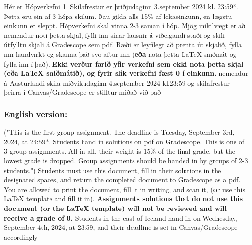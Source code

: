 \noindent
Hér er Hópverkefni 1. Skilafrestur er þriðjudaginn 3.september 2024 kl. 23:59*. Þetta eru ein af 3 hópa skilum. Þau gilda alls 15\% af lokaeinkunn, en lægstu einkunn er sleppt. Hópverkefni skal vinna 2-3 saman í hóp.
\newline
Mjög mikilvægt er að nemendur noti þetta skjal, fylli inn sínar lausnir á viðeigandi staði og skili útfylltu skjali á Gradescope sem pdf. Bæði er leyfilegt að prenta út skjalið, fylla inn handvirkt og skanna það svo aftur inn (\textbf{eða} nota þetta \LaTeX{} sniðmát og fylla inn í það). \textbf{Ekki verður farið yfir verkefni sem ekki nota þetta skjal (eða \LaTeX{} sniðmátið), og fyrir slík verkefni fæst 0 í einkunn.}
\newline
\footnotesize *nemendur á Austurlandi skila miðvikudaginn 4.september 2024 kl.23:59 og skilafrestur þeirra í Canvas/Gradescope er stilltur miðað við það
\normalsize
\subsubsection*{English version:}
("This is the first group assignment. The deadline is Tuesday, September 3rd, 2024, at 23:59*. Students hand in solutions on pdf on Gradescope. This is one of 3 group assignments. All in all, their weight is 15\% of the final grade, but the lowest grade is dropped. Group assignments should be handed in by groups of 2-3 students.")
\newline
Students must use this document, fill in their solutions in the designated spaces, and return the completed document to Gradescope as a pdf. You are allowed to print the document, fill it in writing, and scan it, (\textbf{or} use this \LaTeX{} template and fill it in). \textbf{Assignments solutions that do not use this document (or the \LaTeX{} template) will not be reviewed and will receive a grade of 0.}
\newline
\footnotesize *Students in the east of Iceland hand in on Wednesday, September 4th, 2024, at 23:59, and their deadline is set in Canvas/Gradescope accordingly
\normalsize
\newpage